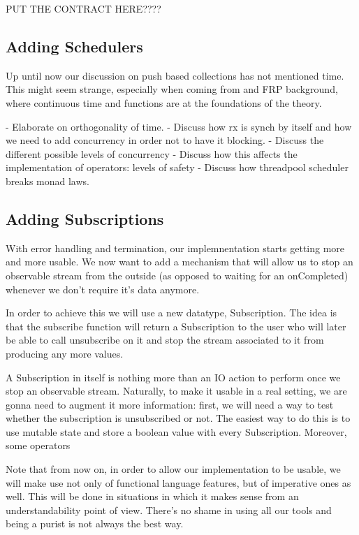 PUT THE CONTRACT HERE????

\subsection{Adding Schedulers}
\label{subsec:subsec02}

Up until now our discussion on push based collections has not mentioned time. This might seem strange, especially when coming from and FRP background, where continuous time and functions are at the foundations of the theory. 

- Elaborate on orthogonality of time.
- Discuss how rx is synch by itself and how we need to add concurrency in order not to have it blocking. 
- Discuss the different possible levels of concurrency
- Discuss how this affects the implementation of operators: levels of safety
- Discuss how threadpool scheduler breaks monad laws. 
\subsection{Adding Subscriptions}
\label{subsec:subsec02}

With error handling and termination, our implemnentation starts getting more and more usable. We now want to add a mechanism that will allow us to stop an observable stream from the outside (as opposed to waiting for an onCompleted) whenever we don't require it's data anymore. 

In order to achieve this we will use a new datatype, Subscription. The idea is that the subscribe function will return a Subscription to the user who will later be able to call unsubscribe on it and stop the stream associated to it from producing any more values.


A Subscription in itself is nothing more than an IO action to perform once we stop an observable stream. Naturally, to make it usable in a real setting, we are gonna need to augment it more information: first, we will need a way to test whether the subscription is unsubscribed or not. The easiest way to do this is to use mutable state and store a boolean value with every Subscription. Moreover, some operators 

Note that from now on, in order to allow our implementation to be usable, we will make use not only of functional language features, but of imperative ones as well. This will be done in situations in which it makes sense from an understandability point of view. There's no shame in using all our tools and being a purist is not always the best way.

